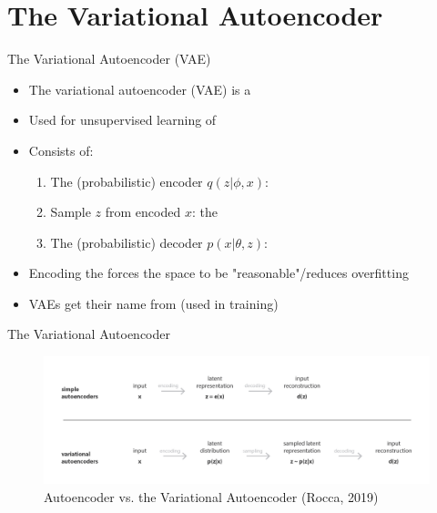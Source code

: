 \documentclass[10pt]{beamer}
\begin{document}
\section{The Variational Autoencoder}
\frame{\sectionpage}

\begin{frame}{The Variational Autoencoder (VAE)}
\begin{itemize}
\item The variational autoencoder (VAE) is a 
\item Used for unsupervised learning of \pause
\item Consists of:
\begin{enumerate}
\item The (probabilistic) encoder $q(z|\phi, x)$: \pause
\item Sample $z$ from encoded $x$: the \pause
\item The (probabilistic) decoder $p(x|\theta, z)$: 
\end{enumerate}
\pause
\item Encoding the  forces the space to be "reasonable"/reduces overfitting
\pause
\item VAEs get their name from  (used in training)
\end{itemize}

\end{frame}


\begin{frame}{The Variational Autoencoder}

\begin{figure}[h]
\centering
\includegraphics[width=1\textwidth]{fig/Rocca_AE_vs_VAE.png}
\caption{Autoencoder vs. the Variational Autoencoder (Rocca, 2019)}
\end{figure}

\end{frame}
\end{document}
